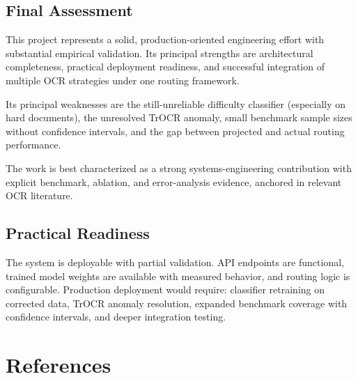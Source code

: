 \documentclass[12pt,a4paper]{article}
\begin{document}
\subsection{Final Assessment}

This project represents a solid, production-oriented engineering
effort with substantial empirical validation. Its principal strengths
are architectural completeness, practical deployment readiness, and
successful integration of multiple OCR strategies under one routing
framework.

Its principal weaknesses are the still-unreliable difficulty
classifier (especially on hard documents), the unresolved TrOCR
anomaly, small
benchmark sample sizes without confidence intervals, and the gap
between projected and actual routing performance.

The work is best characterized as a strong systems-engineering
contribution with explicit benchmark, ablation, and error-analysis
evidence, anchored in relevant OCR literature.

\subsection{Practical Readiness}

The system is deployable with partial validation. API endpoints are
functional, trained model weights are available with measured
behavior, and routing logic is configurable. Production deployment
would require: classifier retraining on corrected data, TrOCR
anomaly resolution, expanded benchmark coverage with confidence
intervals, and deeper integration testing.

\newpage

\section*{References}
\end{document}
